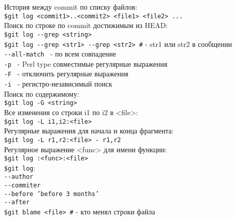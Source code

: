 \noindent История между commit по списку файлов: \\
\indent \texttt{\$git log <commit1>..<commit2> <file1> <file2> ...} \\

\noindent Поиск по строке по commit достижимым из HEAD: \\
\indent \texttt{\$git log {-}-grep <string>}\\
\noindent \texttt{\$git log {-}-grep <str1> {-}-grep <str2> \#} - str1 или str2 в сообщении \\
\indent \indent \texttt{{-}-all-match \indent} - по всем совпадение \\
\indent \indent \texttt{-p \indent} - Perl type совместимые регулярные выражения \\
\indent \indent \texttt{-F \indent} - отключить регулярные выражения \\
\indent \indent \texttt{-i \indent} - регистро-независимый поиск \\

\noindent Поиск по содержимому: \\
\indent \texttt{\$git log -G <string>}\\
\noindent Все изменения со строки i1 по i2 в <file>: \\
\indent \texttt{\$git log -L i1,i2:<file>}\\
\noindent Регулярные выражения для начала и конца фрагмента: \\
\indent \texttt{\$git log -L r1,r2:<file> - r1,r2}\\
\noindent Регулярное выражение <func> для имени функции: \\
\indent \texttt{\$git log :<func>:<file>} \\

\noindent \texttt{\$git log}: \\
\indent \texttt{{-}-author} \\
\indent \texttt{{-}-commiter} \\
\indent \texttt{{-}-before 'before 3 months'} \\
\indent \texttt{{-}-after} \\

\noindent \texttt{\$git blame <file> \indent\#} - кто менял строки файла \\